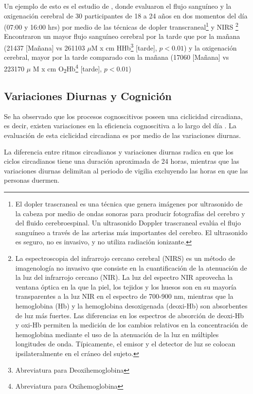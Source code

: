 \documentclass[12pt,letterpaper,final]{article}
\newcommand{\rpm}{\raisebox{.2ex}{$\scriptstyle\pm$}} %
\let\cite\cite %
\begin{document}
Un ejemplo de esto es el estudio de , donde evaluaron el flujo sanguíneo y la oxigenación cerebral de 30 participantes de 18 a 24 años en dos momentos del día (07:00 y 16:00 hrs) por medio de las técnicas de dopler transcraneal\footnote{El dopler trascraneal es una técnica que genera imágenes por ultrasonido de la cabeza por medio de ondas sonoras para producir fotografías del cerebro y del fluido cerebroespinal. Un ultrasonido Doppler trascraneal evalúa el flujo sanguíneo a través de las arterias más importantes del cerebro. El ultrasonido es seguro, no es invasivo, y no utiliza radiación ionizante.} y NIRS \footnote{La  espectroscopia del infrarrojo cercano cerebral (NIRS) es un método de imagenología no invasivo que consiste en la cuantificación de la atenuación de la luz del infrarrojo cercano (NIR). La luz del espectro NIR aprovecha la ventana óptica en la que la piel, los tejidos y los huesos son en su mayoría transparentes a la luz NIR en el espectro de 700-900 nm, mientras que la hemoglobina (Hb) y la hemoglobina desoxigenada (deoxi-Hb) son absorbentes de luz más fuertes. Las diferencias en los espectros de absorción de deoxi-Hb y oxi-Hb permiten la medición de los cambios relativos en la concentración de hemoglobina mediante el uso de la atenuación de la luz en múltiples longitudes de onda. Típicamente, el emisor y el detector de luz se colocan ipsilateralmente en el cráneo del sujeto.} 
Encontraron un mayor flujo sanguíneo cerebral por la tarde que por la mañana (214\rpm 37  [Mañana]  vs 261\rpm 103 $\mu$M x cm HHb\footnote{Abreviatura para Deoxihemoglobina} [tarde],  $ p< 0.01 $) y la oxigenación cerebral, mayor por la tarde comparado con la mañana (170\rpm 60 [Mañana]  vs 223\rpm 170 $\mu$ M x cm O\textsubscript{2}Hb\footnote{Abreviatura para Oxihemoglobina} [tarde], $p < 0.01$)

\subsection{Variaciones Diurnas y Cognición}
Se ha observado que los procesos cognoscitivos poseen una ciclicidad circadiana, es decir, existen variaciones en la eficiencia cognoscitiva a lo largo del día \cite{Valdez2012}. La evaluación de esta ciclicidad circadiana es por medio de las variaciones diurnas.

La diferencia entre ritmos circadianos y variaciones diurnas radica en que los ciclos circadianos tiene una duración aproximada de 24 horas, mientras que las variaciones diurnas delimitan al periodo de vigilia excluyendo las horas en que las personas duermen.
\end{document}
